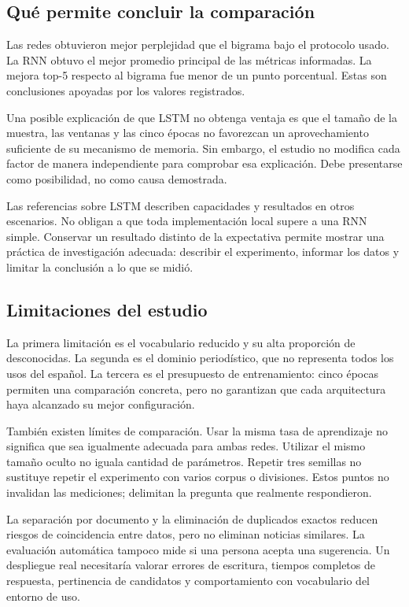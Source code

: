 \subsection{Qué permite concluir la comparación}
Las redes obtuvieron mejor perplejidad que el bigrama bajo el protocolo usado. La RNN obtuvo el mejor promedio principal de las métricas informadas. La mejora top-5 respecto al bigrama fue menor de un punto porcentual. Estas son conclusiones apoyadas por los valores registrados.

Una posible explicación de que LSTM no obtenga ventaja es que el tamaño de la muestra, las ventanas y las cinco épocas no favorezcan un aprovechamiento suficiente de su mecanismo de memoria. Sin embargo, el estudio no modifica cada factor de manera independiente para comprobar esa explicación. Debe presentarse como posibilidad, no como causa demostrada.

Las referencias sobre LSTM describen capacidades y resultados en otros escenarios. No obligan a que toda implementación local supere a una RNN simple. Conservar un resultado distinto de la expectativa permite mostrar una práctica de investigación adecuada: describir el experimento, informar los datos y limitar la conclusión a lo que se midió.

\subsection{Limitaciones del estudio}
La primera limitación es el vocabulario reducido y su alta proporción de desconocidas. La segunda es el dominio periodístico, que no representa todos los usos del español. La tercera es el presupuesto de entrenamiento: cinco épocas permiten una comparación concreta, pero no garantizan que cada arquitectura haya alcanzado su mejor configuración.

También existen límites de comparación. Usar la misma tasa de aprendizaje no significa que sea igualmente adecuada para ambas redes. Utilizar el mismo tamaño oculto no iguala cantidad de parámetros. Repetir tres semillas no sustituye repetir el experimento con varios corpus o divisiones. Estos puntos no invalidan las mediciones; delimitan la pregunta que realmente respondieron.

La separación por documento y la eliminación de duplicados exactos reducen riesgos de coincidencia entre datos, pero no eliminan noticias similares. La evaluación automática tampoco mide si una persona acepta una sugerencia. Un despliegue real necesitaría valorar errores de escritura, tiempos completos de respuesta, pertinencia de candidatos y comportamiento con vocabulario del entorno de uso.


